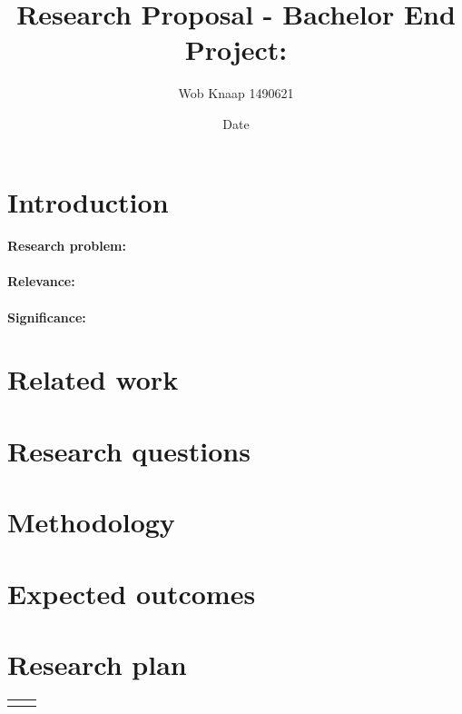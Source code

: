 \documentclass[a4paper]{article}
\title{Research Proposal - Bachelor End Project:}
\author{Wob Knaap 1490621}
\date{Date}
\begin{document}
\maketitle

\section{Introduction}
\label{sec:introduction}

\paragraph{Research problem:}

\paragraph{Relevance:}

\paragraph{Significance:}

\section{Related work}
\label{sec:related-work}



\section{Research questions}
\label{sec:research-questions}





\section{Methodology}







\section{Expected outcomes}



\section{Research plan}

\begin{small}
\begin{longtable}{|p{5cm}|p{14cm}|}
\hline
\hline
\endfirsthead
\hline
\hline
\endhead
\hline
\endfoot



\end{longtable}
\end{small}

\FloatBarrier



\end{document}
